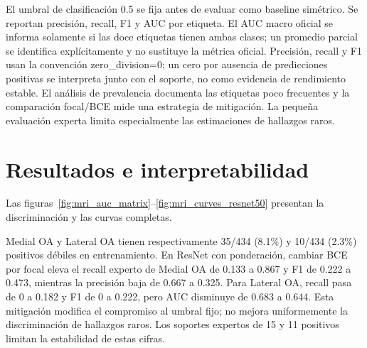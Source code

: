 El umbral de clasificación 0.5 se fija antes de evaluar como baseline simétrico.
Se reportan precisión, recall, F1 y AUC por etiqueta.
El AUC macro oficial se informa solamente si las doce etiquetas tienen ambas clases;
un promedio parcial se identifica explícitamente y no sustituye la métrica oficial.
Precisión, recall y F1 usan la convención zero\_division=0; un cero por ausencia de predicciones
positivas se interpreta junto con el soporte, no como evidencia de rendimiento estable.
El análisis de prevalencia documenta las etiquetas poco frecuentes y la comparación focal/BCE mide
una estrategia de mitigación. La pequeña evaluación experta limita especialmente las estimaciones de hallazgos raros.

\section{Resultados e interpretabilidad}
\FloatBarrier

Las figuras~\ref{fig:mri_auc_matrix}--\ref{fig:mri_curves_resnet50} presentan la discriminación y las curvas completas.

Medial OA y Lateral OA tienen respectivamente 35/434 (8.1\%) y 10/434 (2.3\%) positivos débiles
en entrenamiento. En ResNet con ponderación, cambiar BCE por focal eleva el recall experto de
Medial OA de 0.133 a 0.867 y F1 de 0.222 a 0.473, mientras la precisión baja de 0.667 a 0.325.
Para Lateral OA, recall pasa de 0 a 0.182 y F1 de 0 a 0.222, pero AUC disminuye de 0.683 a 0.644.
Esta mitigación modifica el compromiso al umbral fijo; no mejora uniformemente la discriminación
de hallazgos raros. Los soportes expertos de 15 y 11 positivos limitan la estabilidad de estas cifras.

